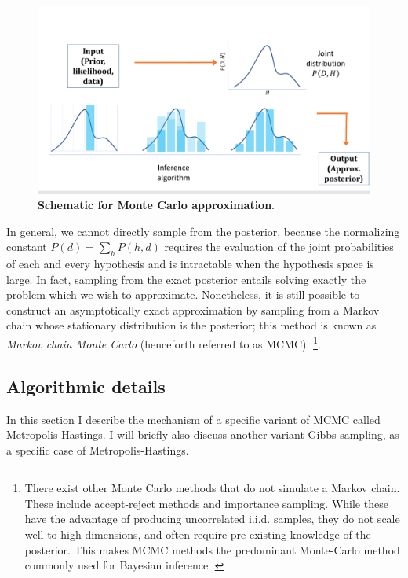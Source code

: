 \begin{figure}
\centering
\includegraphics[width = \textwidth]{figures/MonteCarlo_schematic.pdf}
\caption{\textbf{Schematic for Monte Carlo approximation}. }
\label{fig:MC_schematic}
\end{figure}

In general, we cannot directly sample from the posterior, because the normalizing constant $P(d) = \sum_{h} P(h,d)$ requires the evaluation of the joint probabilities of each and every hypothesis and is intractable when the hypothesis space is large. In fact, sampling from the exact posterior entails solving exactly the problem which we wish to approximate. Nonetheless, it is still possible to construct an asymptotically exact approximation by sampling from a Markov chain whose stationary distribution is the posterior; this method is known as \emph{Markov chain Monte Carlo} (henceforth referred to as MCMC). \footnote{There exist other Monte Carlo methods that do not simulate a Markov chain. These include accept-reject methods and importance sampling. While these have the advantage of producing uncorrelated i.i.d. samples, they do not scale well to high dimensions, and often require pre-existing knowledge of the posterior. This makes MCMC methods the predominant Monte-Carlo method commonly used for Bayesian inference \cite{neal1993probabilistic, andrieu2003introduction}.}.

\subsection{Algorithmic details}

In this section I describe the mechanism of a specific variant of MCMC called Metropolis-Hastings. I will briefly also discuss another variant Gibbs sampling, as a specific case of Metropolis-Hastings.

